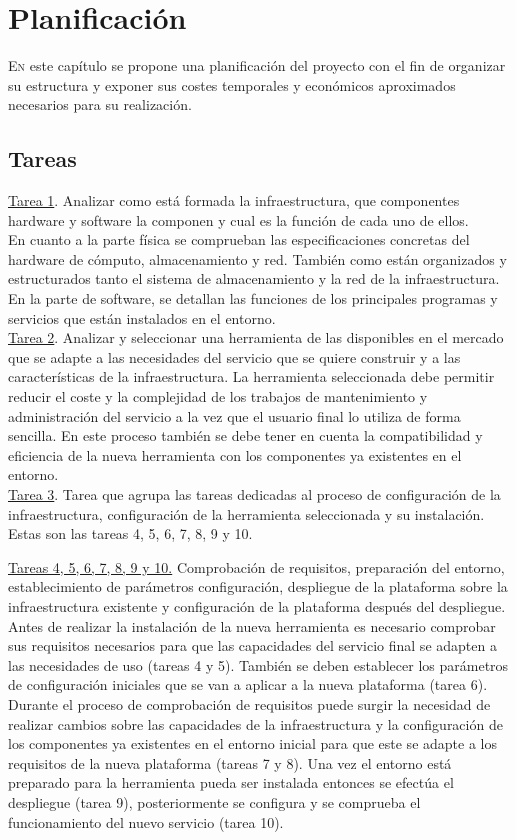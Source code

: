 \chapter{Planificación}
\label{chap:planificacionProyecto}
\lettrine{E}{n} este capítulo se propone una planificación del proyecto con el fin de organizar su estructura y exponer sus costes temporales y económicos aproximados necesarios para su realización.

\section{Tareas}
\underline{Tarea 1}. Analizar como está formada la infraestructura, que componentes hardware y software la componen y cual es la función de cada uno de ellos.\\
En cuanto a la parte física se comprueban las especificaciones concretas del hardware de cómputo, almacenamiento y red. También como están organizados y estructurados tanto el sistema de almacenamiento y la red de la infraestructura. En la parte de software, se detallan las funciones de los principales programas y servicios que están instalados en el entorno.\\

\underline{Tarea 2}. Analizar y seleccionar una herramienta de las disponibles en el mercado que se adapte a las necesidades del servicio que se quiere construir y a las características de la infraestructura. La herramienta seleccionada debe permitir reducir el coste y la complejidad de los trabajos de mantenimiento y administración del servicio a la vez que el usuario final lo utiliza de forma sencilla. En este proceso también se debe tener en cuenta la compatibilidad y eficiencia de la nueva herramienta con los componentes ya existentes en el entorno.\\

\underline{Tarea 3}. Tarea que agrupa las tareas dedicadas al proceso de configuración de la infraestructura, configuración de la herramienta seleccionada y su instalación. Estas son las tareas 4, 5, 6, 7, 8, 9 y 10.

\underline{ Tareas 4, 5, 6, 7, 8, 9 y 10.}
Comprobación de requisitos, preparación del entorno, establecimiento de parámetros configuración, despliegue de la plataforma sobre la infraestructura existente y configuración de la plataforma después del despliegue. Antes de realizar la instalación de la nueva herramienta es necesario comprobar sus requisitos necesarios para que las capacidades del servicio final se adapten a las necesidades de uso (tareas 4 y 5). También se deben establecer los parámetros de configuración iniciales que se van a aplicar a la nueva plataforma (tarea 6). Durante el proceso de comprobación de requisitos puede surgir la necesidad de realizar cambios sobre las capacidades de la infraestructura y la configuración de los componentes ya existentes en el entorno inicial para que este se adapte a los requisitos de la nueva plataforma (tareas 7 y 8). Una vez el entorno está preparado para la herramienta pueda ser instalada entonces se efectúa el despliegue (tarea 9), posteriormente se configura y se comprueba el funcionamiento del nuevo servicio (tarea 10).\\

